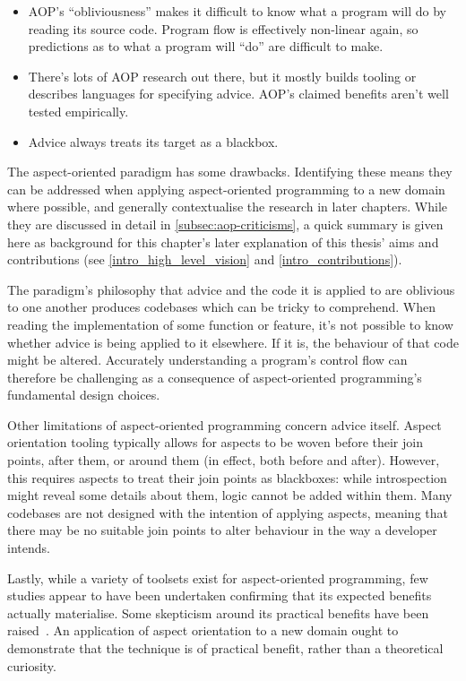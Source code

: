 

\begin{itemize}
  \item AOP's ``obliviousness'' makes it difficult to know what a program will
    do by reading its source code. Program flow is effectively non-linear again,
    so predictions as to what a program will ``do'' are difficult to make.
  \item There's lots of AOP research out there, but it mostly builds tooling or
    describes languages for specifying advice. AOP's claimed benefits aren't
    well tested empirically.
  \item Advice always treats its target as a blackbox.
\end{itemize}

The aspect-oriented paradigm has some drawbacks. Identifying these means they
can be addressed when applying aspect-oriented programming to a new domain where
possible, and generally contextualise the research in later chapters. While they
are discussed in detail in \cref{subsec:aop-criticisms}, a quick summary is
given here as background for this chapter's later explanation of this thesis'
aims and contributions (see \cref{intro_high_level_vision} and \cref{intro_contributions}).

The paradigm's philosophy that advice and the code it is applied to are
oblivious to one another produces codebases which can be tricky to
comprehend. When reading the implementation of some function or
feature, it's not possible to know whether advice is being applied to it
elsewhere. If it is, the behaviour of that code might be altered. Accurately
understanding a program's control flow can therefore be challenging as a
consequence of aspect-oriented programming's fundamental design choices.

Other limitations of aspect-oriented programming concern advice itself. Aspect
orientation tooling typically allows for aspects to be woven before their join
points, after them, or around them (in effect, both before and after). However,
this requires aspects to treat their join points as blackboxes: while
introspection might reveal some details about them, logic cannot be added within
them. Many codebases are not designed with the intention of applying aspects,
meaning that there may be no suitable join points to alter behaviour in the way
a developer intends.

Lastly, while a variety of toolsets exist for aspect-oriented programming, few
studies appear to have been undertaken confirming that its expected benefits
actually materialise. Some skepticism around its practical benefits have been
raised~\cite{steimann06paradoxical,przybylek2010wrong,Constantinides04aopconsidered}.
An application of aspect orientation to a new domain ought to demonstrate
that the technique is of practical benefit, rather than a theoretical curiosity.



